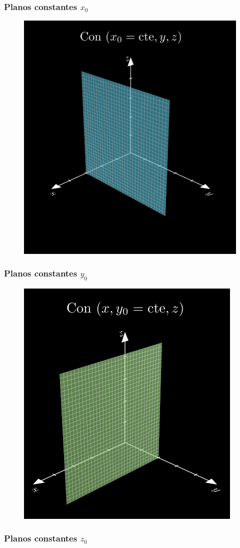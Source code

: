 \documentclass[12pt]{beamer}
\begin{document}
{ %
\begin{frame}
\frametitle{Planos constantes $x_{0}$}
\begin{figure}[H]
   \centering
   \includegraphics[width=0.6\linewidth]{Imagenes/superficies_01_plano_x.png}
   \label{fig:plano_x}
\end{figure}
\end{frame}
\begin{frame}\frametitle{Planos constantes $y_{0}$}
\begin{figure}[H]
   \centering
   \includegraphics[width=0.6\linewidth]{Imagenes/superficies_02_plano_y.png}
   \label{fig:plano_y}
\end{figure}
\end{frame}
\begin{frame}
\frametitle{Planos constantes $z_{0}$}
\begin{figure}[H]

\end{figure}
\end{frame}}
\end{document}
